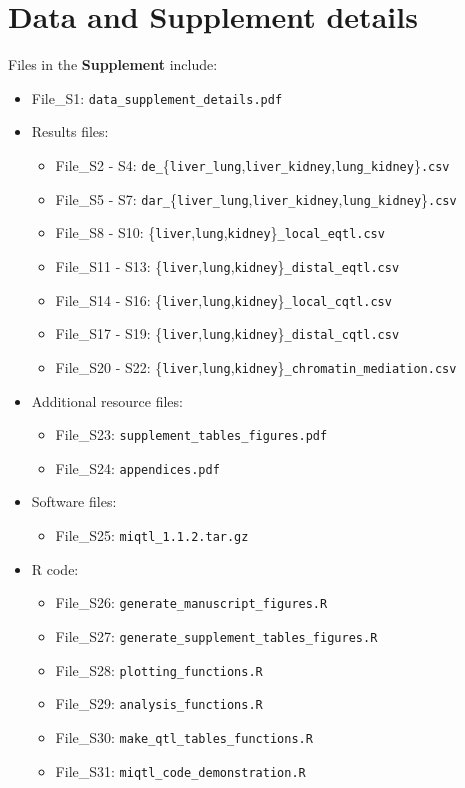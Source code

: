 \documentclass[10pt,letterpaper,twoside]{article}
\begin{document}
\section*{Data and Supplement details}

Files  in the \textbf{Supplement} include:

\begin{itemize}
	\item File\_S1: \texttt{data\_supplement\_details.pdf}
	\item Results files:
	\begin{itemize}
		\item File\_S2 - S4: \texttt{de\_}\{\texttt{liver\_lung},\texttt{liver\_kidney},\texttt{lung\_kidney}\}\texttt{.csv}
		\item File\_S5 - S7: \texttt{dar\_}\{\texttt{liver\_lung},\texttt{liver\_kidney},\texttt{lung\_kidney}\}\texttt{.csv}
		\item File\_S8 - S10: \{\texttt{liver},\texttt{lung},\texttt{kidney}\}\texttt{\_local\_eqtl.csv}
		\item File\_S11 - S13: \{\texttt{liver},\texttt{lung},\texttt{kidney}\}\texttt{\_distal\_eqtl.csv}
		\item File\_S14 - S16: \{\texttt{liver},\texttt{lung},\texttt{kidney}\}\texttt{\_local\_cqtl.csv}
		\item File\_S17 - S19: \{\texttt{liver},\texttt{lung},\texttt{kidney}\}\texttt{\_distal\_cqtl.csv}
		\item File\_S20 - S22: \{\texttt{liver},\texttt{lung},\texttt{kidney}\}\texttt{\_chromatin\_mediation.csv}
	\end{itemize}
	\item Additional resource files:
	\begin{itemize}
		\item File\_S23: \texttt{supplement\_tables\_figures.pdf}
		\item File\_S24: \texttt{appendices.pdf}
	\end{itemize}
		\item Software files:
	\begin{itemize}
		\item File\_S25: \texttt{miqtl\_1.1.2.tar.gz}
	\end{itemize}
	\item R code:
	\begin{itemize}
		\item File\_S26: \texttt{generate\_manuscript\_figures.R}
		\item File\_S27: \texttt{generate\_supplement\_tables\_figures.R}
		\item File\_S28: \texttt{plotting\_functions.R}
		\item File\_S29: \texttt{analysis\_functions.R}
		\item File\_S30: \texttt{make\_qtl\_tables\_functions.R}
		\item File\_S31: \texttt{miqtl\_code\_demonstration.R}
	\end{itemize}
\end{itemize}
\end{document}
